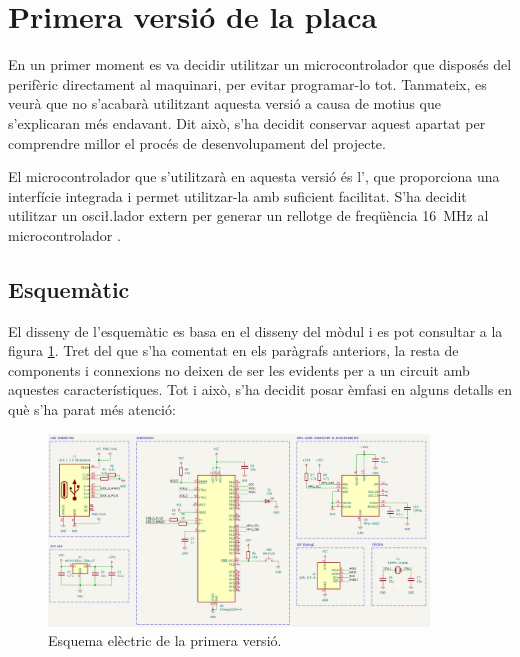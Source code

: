 \section{Primera versió de la placa}

En un primer moment es va decidir utilitzar un microcontrolador que disposés
del perifèric  directament al maquinari, per evitar programar-lo tot.
Tanmateix, es veurà que no s'acabarà utilitzant aquesta versió a causa de motius
que s'explicaran més endavant. Dit això, s'ha decidit conservar aquest apartat
per comprendre millor el procés de desenvolupament del projecte.

El microcontrolador que s'utilitzarà en aquesta versió és l', 
que proporciona una interfície  integrada i permet utilitzar-la
 amb suficient facilitat. S'ha decidit utilitzar un osci\l.lador 
extern per generar un rellotge de freqüència
\SI[round-mode=places,round-precision=0]{16}{\mega\hertz}
al microcontrolador \cite{AtMega32u4}.

\subsection{Esquemàtic}

El disseny de l'esquemàtic es basa en el disseny del mòdul  i es pot
consultar a la figura \ref{fig:sch_v1}. Tret del que s'ha comentat en els paràgrafs
anteriors, la resta de components i connexions no deixen de ser les evidents per
a un circuit amb aquestes característiques. Tot i això, s'ha decidit posar
èmfasi en alguns detalls en què s'ha parat més atenció:

\begin{figure}[ht]
    \centering
    \includegraphics[width=0.9\textwidth]{images/kicad/gyro1_sch.png}
    \caption{Esquema elèctric de la primera versió.}
    \label{fig:sch_v1}
\end{figure}

